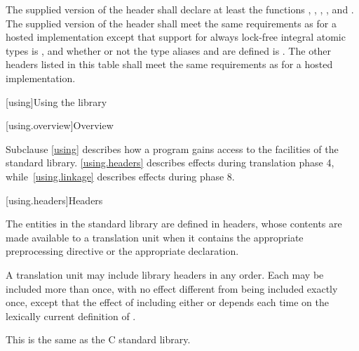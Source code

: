 \pnum
The supplied version of the header 
shall declare at least the functions
%
,
%
,
%
,
%
,
and
%
.
%
The supplied version of the header 
shall meet the same requirements as for a hosted implementation
except that support for
always lock-free integral atomic types
is , and
whether or not the type aliases  and
 are defined
is .
The other headers listed in this table
shall meet the same requirements as for a hosted implementation.
%

[using]{Using the library}

[using.overview]{Overview}

\pnum
Subclause \ref{using} describes how a \Cpp{} program gains access to the facilities of the
\Cpp{} standard library. \ref{using.headers} describes effects during translation
phase 4, while~\ref{using.linkage} describes effects during phase
8.

[using.headers]{Headers}

\pnum
The entities in the \Cpp{} standard library are defined in headers,
whose contents are made available to a translation unit when it contains the appropriate
%
%
preprocessing directive
or the appropriate
%
 declaration.

\pnum
A translation unit may include library headers in any order.
%
Each may be included more than once, with no effect different from
being included exactly once, except that the effect of including either
 or 
depends each time on the lexically current definition of
%
%
.
\begin{footnote}
This is the same as the C standard library.
\end{footnote}


